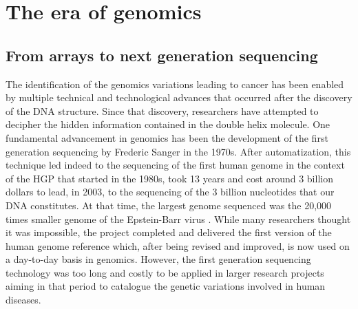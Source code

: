 


\section{The era of genomics}
\label{Intro-ngs} 
\subsection{From arrays to next generation sequencing} %

The identification of the genomics variations leading to cancer has been enabled by multiple technical and technological advances that occurred after the discovery of the \gls*{DNA} structure. Since that discovery, researchers have attempted to decipher the hidden information contained in the double helix molecule. 
One fundamental advancement in genomics has been the development of the first generation sequencing by Frederic Sanger in the 1970s. After automatization, this technique led indeed to the sequencing of the first human genome in the context of the \gls{HGP} that started
in the 1980s, took 13 years and cost around 3 billion dollars to lead, in 2003, to the sequencing of the 3 billion nucleotides that our \gls*{DNA} constitutes. At that time, the largest genome sequenced was the 20,000 times smaller genome of the Epstein-Barr virus \cite{Roberts2001}. While many researchers thought it was impossible, the project completed and delivered the first version of the human genome reference which, after being revised and improved, is now used on a day-to-day basis in genomics.
However, the first generation sequencing technology was too long and costly to be applied in larger research projects aiming in that period to catalogue the genetic variations involved in human diseases.


